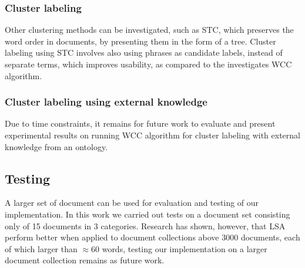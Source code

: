\subsubsection{Cluster labeling}
Other clustering methods can be investigated, such as \gls{STC}, which preserves the word order in documents, by presenting them in the form of a tree. Cluster labeling using \gls{STC} involves also using phrases as candidate labels, instead of separate terms, which improves usability, as compared 
to the investigates \gls{WCC} algorithm. \\

\subsubsection{Cluster labeling using external knowledge}
Due to time constraints, it remains for future work to evaluate and present experimental results on running \gls{WCC} algorithm for cluster labeling with external knowledge from an ontology. \\

\subsection{Testing}
A larger set of document can be used for evaluation and testing of our implementation. In this work we carried out tests on a document set consisting only of 15 documents in 3 categories. Research has shown, however, that \gls{LSA} perform better when applied to document collections above 3000 documents, each of which larger than $\approx 60$ words, testing our implementation on a larger document collection remains as future work. \\

